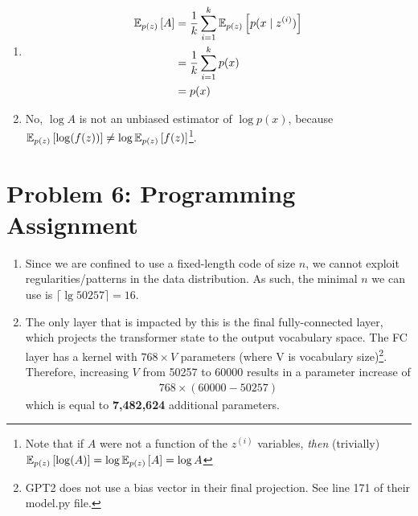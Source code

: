 \documentclass[11pt]{article}
\begin{document}
\begin{enumerate}
	\item {}
	\begin{align}
		\E[p(z)]{A} 
			&= \inv{k} \sum_{i=1}^{k} \E[p(z)]{p(x \mid z^{(i)})} \\
			&= \inv{k} \sum_{i=1}^{k} p(x) \\
			&= p(x)
	\end{align}
	
	
	\item {} No, $\log A$ is not an unbiased estimator of $\log p(x)$, because $\E[p(z)]{\log(f(z))} \ne \log \E[p(z)]{f(z)}$\footnote{Note that if $A$ were not a function of the $z^{(i)}$ variables, \textit{then} (trivially) $\E[p(z)]{\log(A)} = \log \E[p(z)]{A} = \log A$}.
	
	
\end{enumerate}




\clearpage
\section*{Problem 6: Programming Assignment}

\begin{enumerate}
	\item {} 
	
	Since we are confined to use a fixed-length code of size $n$, we cannot exploit regularities/patterns in the data distribution. As such, the minimal $n$ we can use is $\lceil \lg 50257 \rceil = 16$. 
	
	\item {} 
	
	The only layer that is impacted by this is the final fully-connected layer, which projects the transformer state to the output vocabulary space. The FC layer has a kernel with $768 \times V$ parameters (where V is vocabulary size)\footnote{GPT2 does not use a bias vector in their final projection. See line 171 of their model.py file.}. Therefore, increasing $V$ from 50257 to 60000 results in a parameter increase of 
	\begin{align}
		768 \times (60000 -50257 ) 
	\end{align}
	which is equal to \textbf{7,482,624} additional parameters. 
\end{enumerate}
\end{document}
